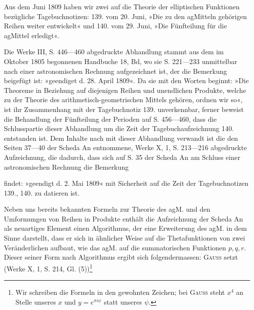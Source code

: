 \par\medskip
\begin{center}
\end{center}
\noindent\hspace*{\parindent}Aus dem Juni 1809 haben wir zwei auf die Theorie der elliptischen
Funktionen bezügliche Tagebuchnotizen: 139. vom 20. Juni, »Die zu den
agMitteln gehörigen Reihen weiter entwickelt« und 140. vom 29. Juni, »Die
Fünfteilung für die agMittel erledigt«.
\par
Die Werke III, S. 446—460 abgedruckte Abhandlung stammt aus dem
im Oktober 1805 begonnenen Handbuche 18, Bd, wo sie S. 221—233 unmittelbar
nach einer astronomischen Rechnung aufgezeichnet ist, der die Bemerkung
beigefügt ist: »geendiget d. 28. April 1809«. Da sie mit den Worten
beginnt: »Die Theoreme in Beziehung auf diejenigen Reihen und unendlichen
Produkte, welche zu der Theorie des arithmetisch-geometrischen Mittels gehören,
ordnen wir so«, ist ihr Zusammenhang mit der Tagebuchnotiz 139.
unverkennbar, ferner beweist die Behandlung der Fünfteilung der Perioden
auf S. 456—460, dass die Schlusspartie dieser Abhandlung um die Zeit der
Tagebuchaufzeichnung 140. entstanden ist. Dem Inhalte nach mit dieser Abhandlung
verwandt ist die den Seiten 37—40 der Scheda An entnommene,
Werke X, 1, S. 213—216 abgedruckte Aufzeichnung, die dadurch, dass sich
auf S. 35 der Scheda An am Schluss einer astronomischen Rechnung die Bemerkung\par
{}
\clearpage{}
\noindent findet: »geendigt d. 2. Mai 1809« mit Sicherheit auf die Zeit der
Tagebuchnotizen 139., 140. zu datieren ist.
\par
Neben uns bereits bekannten Formeln zur Theorie des agM. und den
Umformungen von Reihen in Produkte enthält die Aufzeichnung der Scheda
An als neuartiges Element einen Algorithmus, der eine Erweiterung des agM.
in dem Sinne darstellt, dass er sich in ähnlicher Weise auf die Thetafunktionen
von zwei Veränderlichen aufbaut, wie das agM. auf die summatorischen
Funktionen \(p,q,r\). Dieser seiner Form nach  Algorithmus ergibt
sich folgendermassen: \textsc{Gauss} setzt (Werke X, 1, S. 214, Gl. (5))\footnote{Wir schreiben die Formeln in den gewohnten Zeichen; bei \textsc{Gauss} steht \(x^4\) an Stelle unseres \(x\) und \(y=e^{\pi i\psi}\) statt unseres \(\psi\).}
\begingroup\makeatletter\tagsleft@true\let\veqno\leqno\makeatother
